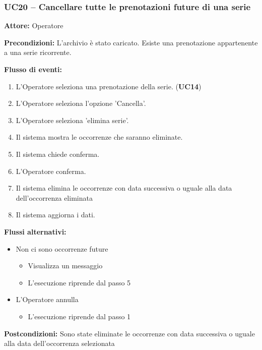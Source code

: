\documentclass[a4paper,11pt]{article}
\begin{document}
\begin{samepage}
\subsubsection*{UC20 -- Cancellare tutte le prenotazioni future di una serie}
\begin{ucbox}

\noindent\textbf{Attore:} Operatore\par
\noindent\textbf{Precondizioni:} L'archivio è stato caricato. Esiste una prenotazione appartenente a una serie ricorrente.\par

\noindent\textbf{Flusso di eventi:}
\begin{enumerate}
\item L'Operatore seleziona una prenotazione della serie. (\textbf{UC14})\item L'Operatore seleziona l'opzione 'Cancella'. \item L'Operatore seleziona 'elimina serie'. \item Il sistema mostra le occorrenze che saranno eliminate. \item Il sistema chiede conferma. \item L'Operatore conferma. \item Il sistema elimina le occorrenze con data successiva o uguale alla data dell'occorrenza eliminata \item Il sistema aggiorna i dati. \end{enumerate}
\noindent\textbf{Flussi alternativi:}
\begin{itemize}
\item[4a.] Non ci sono occorrenze future
\begin{itemize}
\item Visualizza un messaggio
\item L'esecuzione riprende dal passo 5
\end{itemize}
\item[6a.] L'Operatore annulla
\begin{itemize}
\item L'esecuzione riprende dal passo 1
\end{itemize}
\end{itemize}
\noindent\textbf{Postcondizioni:} Sono state eliminate le occorrenze con data successiva o uguale alla data dell'occorrenza selezionata\par
\end{ucbox}
\end{samepage}
\end{document}
